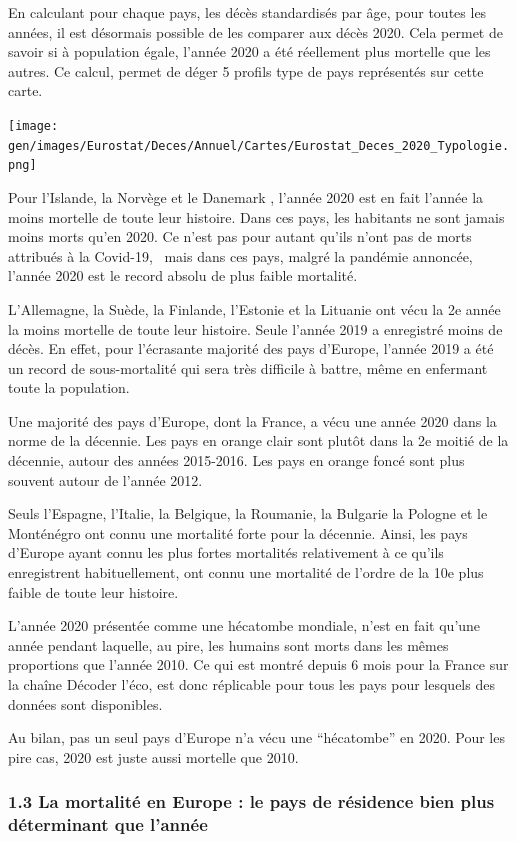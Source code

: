 \documentclass[
]{article}
\begin{document}
En calculant pour chaque pays, les décès standardisés par âge, pour
toutes les années, il est désormais possible de les comparer aux décès
2020. Cela permet de savoir si à population égale, l'année 2020 a été
réellement plus mortelle que les autres. Ce calcul, permet de déger 5
profils type de pays représentés sur cette carte.

\texttt{[image: gen/images/Eurostat/Deces/Annuel/Cartes/Eurostat\_Deces\_2020\_Typologie.png]}

Pour l'Islande, la Norvège et le Danemark , l'année 2020 est en fait
l'année la moins mortelle de toute leur histoire. Dans ces pays, les
habitants ne sont jamais moins morts qu'en 2020. Ce n'est pas pour
autant qu'ils n'ont pas de morts attribués à la Covid-19, ~mais dans ces
pays, malgré la pandémie annoncée, l'année 2020 est le record absolu de
plus faible mortalité.

L'Allemagne, la Suède, la Finlande, l'Estonie et la Lituanie ont vécu la
2e année la moins mortelle de toute leur histoire. Seule l'année 2019 a
enregistré moins de décès. En effet, pour l'écrasante majorité des pays
d'Europe, l'année 2019 a été un record de sous-mortalité qui sera très
difficile à battre, même en enfermant toute la population.

Une majorité des pays d'Europe, dont la France, a vécu une année 2020
dans la norme de la décennie. Les pays en orange clair sont plutôt dans
la 2e moitié de la décennie, autour des années 2015-2016. Les pays en
orange foncé sont plus souvent autour de l'année 2012.

Seuls l'Espagne, l'Italie, la Belgique, la Roumanie, la Bulgarie la
Pologne et le Monténégro ont connu une mortalité forte pour la décennie.
Ainsi, les pays d'Europe ayant connu les plus fortes mortalités
relativement à ce qu'ils enregistrent habituellement, ont connu une
mortalité de l'ordre de la 10e plus faible de toute leur histoire.

L'année 2020 présentée comme une hécatombe mondiale, n'est en fait
qu'une année pendant laquelle, au pire, les humains sont morts dans les
mêmes proportions que l'année 2010. Ce qui est montré depuis 6 mois pour
la France sur la chaîne Décoder l'éco, est donc réplicable pour tous les
pays pour lesquels des données sont disponibles.

Au bilan, pas un seul pays d'Europe n'a vécu une ``hécatombe'' en 2020.
Pour les pire cas, 2020 est juste aussi mortelle que 2010.

\hypertarget{la-mortalituxe9-en-europe-le-pays-de-ruxe9sidence-bien-plus-duxe9terminant-que-lannuxe9e}{%
\subsubsection{1.3 La mortalité en Europe : le pays de résidence bien
plus déterminant que
l'année}\label{la-mortalituxe9-en-europe-le-pays-de-ruxe9sidence-bien-plus-duxe9terminant-que-lannuxe9e}}
\end{document}

